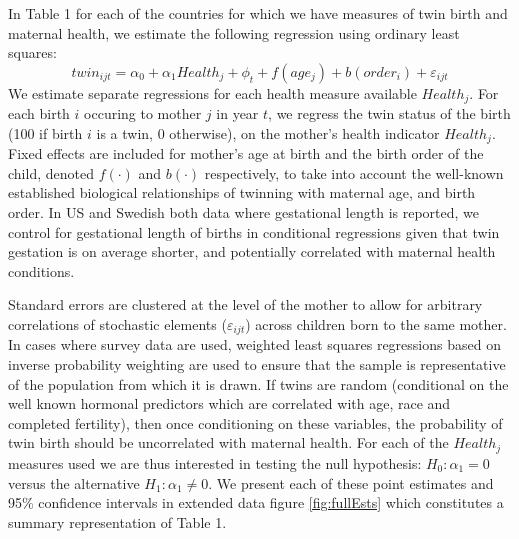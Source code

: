 \documentclass{nature}
\begin{document}
\begin{linenumbers}
In Table 1 for each of the countries for which we have measures of twin birth and maternal health, we estimate the following regression using ordinary least squares:
\begin{equation}
  twin_{ijt}=\alpha_0 + \alpha_1 Health_j + \phi_t + f(age_j) + b(order_i) + \varepsilon_{ijt}
\end{equation}
We estimate separate regressions for each health measure available $Health_j$. For each birth $i$ occuring to mother $j$ in year $t$, we regress the twin status of the birth (100 if birth $i$ is a twin, 0 otherwise), on the mother's health indicator $Health_j$. Fixed effects are included for mother's age at birth and the birth order of the child, denoted $f(\cdot)$ and $b(\cdot)$ respectively, to take into account the well-known established biological relationships of twinning with maternal age, and birth order. In US and Swedish both data where gestational length is reported, we control for gestational length of births in conditional regressions given that twin gestation is on average shorter, and potentially correlated with maternal health conditions\cite{Morrison2005}.  

Standard errors are clustered at the level of the mother to allow for arbitrary correlations of stochastic elements ($\varepsilon_{ijt}$) across children born to the same mother. In cases where survey data are used, weighted least squares regressions based on inverse probability weighting are used to ensure that the sample is representative of the population from which it is drawn. If twins are random (conditional on the well known  hormonal predictors which are correlated with age, race and completed fertility\cite{Hall2003}), then once conditioning on these variables, the probability of twin birth should be uncorrelated with maternal health. For each of the $Health_j$ measures used we are thus interested in testing the null hypothesis: $H_0: \alpha_1=0$ versus the alternative $H_1: \alpha_1\neq0$.  We present each of these point estimates and 95\% confidence intervals in extended data figure \ref{fig:fullEsts} which constitutes a summary representation of Table 1. %


\end{linenumbers}
\end{document}
